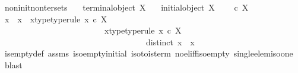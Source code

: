 \begin{isabellebody}
%
\isadelimproof
\isanewline
%
\endisadelimproof
\isanewline
\isanewline
\isanewline
\isanewline
\isanewline
{}\isamarkupfalse%
\ non{\isacharunderscore}{\kern0pt}init{\isacharunderscore}{\kern0pt}non{\isacharunderscore}{\kern0pt}ter{\isacharunderscore}{\kern0pt}sets{\isacharcolon}{\kern0pt}\isanewline
\ \ \ {\isachardoublequoteopen}{\isasymnot}{\isacharparenleft}{\kern0pt}terminal{\isacharunderscore}{\kern0pt}object\ X{\isacharparenright}{\kern0pt}{\isachardoublequoteclose}\isanewline
\ \ \ {\isachardoublequoteopen}{\isasymnot}{\isacharparenleft}{\kern0pt}initial{\isacharunderscore}{\kern0pt}object\ X{\isacharparenright}{\kern0pt}{\isachardoublequoteclose}\isanewline
\ \ \ {\isachardoublequoteopen}{\isasymOmega}\ {\isasymle}\isactrlsub c\ X{\isachardoublequoteclose}\ \isanewline
%
\isadelimproof
%
\endisadelimproof
%
\isatagproof
{}\isamarkupfalse%
\ {\isacharminus}{\kern0pt}\ \isanewline
\ \ \isamarkupfalse%
\ x{}\ \ x{}\ \ x{}{\isacharunderscore}{\kern0pt}type{\isacharbrackleft}{\kern0pt}type{\isacharunderscore}{\kern0pt}rule{\isacharbrackright}{\kern0pt}{\isacharcolon}{\kern0pt}\ {\isachardoublequoteopen}x{}\ {\isasymin}\isactrlsub c\ X{\isachardoublequoteclose}\ \ \isanewline
\ \ \ \ \ \ \ \ \ \ \ \ \ \ \ \ \ \ \ \ \ \ \ \ \ x{}{\isacharunderscore}{\kern0pt}type{\isacharbrackleft}{\kern0pt}type{\isacharunderscore}{\kern0pt}rule{\isacharbrackright}{\kern0pt}{\isacharcolon}{\kern0pt}\ {\isachardoublequoteopen}x{}\ {\isasymin}\isactrlsub c\ X{\isachardoublequoteclose}\ \isanewline
\ \ \ \ \ \ \ \ \ \ \ \ \ \ \ \ \ \ \ \ \ \ \ \ \ \ \ \ \ \ \ \ \ \ \ distinct{\isacharcolon}{\kern0pt}\ {\isachardoublequoteopen}x{}\ {\isasymnoteq}\ x{}{\isachardoublequoteclose}\isanewline
\ \ \ \ \isamarkupfalse%
\ is{\isacharunderscore}{\kern0pt}empty{\isacharunderscore}{\kern0pt}def\ assms\ iso{\isacharunderscore}{\kern0pt}empty{\isacharunderscore}{\kern0pt}initial\ iso{\isacharunderscore}{\kern0pt}to{}{\isacharunderscore}{\kern0pt}is{\isacharunderscore}{\kern0pt}term\ no{\isacharunderscore}{\kern0pt}el{\isacharunderscore}{\kern0pt}iff{\isacharunderscore}{\kern0pt}iso{\isacharunderscore}{\kern0pt}empty\ single{\isacharunderscore}{\kern0pt}elem{\isacharunderscore}{\kern0pt}iso{\isacharunderscore}{\kern0pt}one\ \isamarkupfalse%
\ blast\isanewline
\isanewline
\isanewline

\end{isabellebody}

